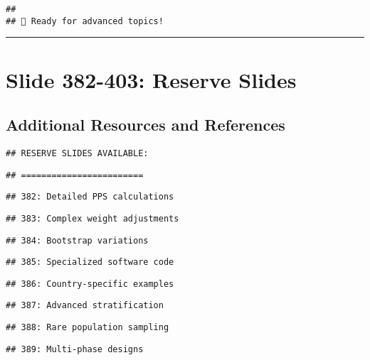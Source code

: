 \documentclass[
]{article}
\begin{document}
\begin{verbatim}
## 
## 💪 Ready for advanced topics!
\end{verbatim}

\begin{center}\rule{0.5\linewidth}{0.5pt}\end{center}

\section{Slide 382-403: Reserve
Slides}\label{slide-382-403-reserve-slides}

\subsection{Additional Resources and
References}\label{additional-resources-and-references}

\begin{verbatim}
## RESERVE SLIDES AVAILABLE:
\end{verbatim}

\begin{verbatim}
## ========================
\end{verbatim}

\begin{verbatim}
## 382: Detailed PPS calculations
\end{verbatim}

\begin{verbatim}
## 383: Complex weight adjustments
\end{verbatim}

\begin{verbatim}
## 384: Bootstrap variations
\end{verbatim}

\begin{verbatim}
## 385: Specialized software code
\end{verbatim}

\begin{verbatim}
## 386: Country-specific examples
\end{verbatim}

\begin{verbatim}
## 387: Advanced stratification
\end{verbatim}

\begin{verbatim}
## 388: Rare population sampling
\end{verbatim}

\begin{verbatim}
## 389: Multi-phase designs
\end{verbatim}
\end{document}
